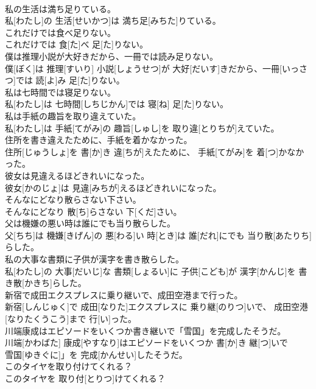 \documentclass[8pt]{extreport}
\begin{document}
\begin{CJK}{UTF8}{min}
\\	私の生活は満ち足りている。	
\\	私[わたし]の 生活[せいかつ]は 満ち足[みちた]りている。
\\	これだけでは食べ足りない。	
\\	これだけでは 食[た]べ 足[た]りない。
\\	僕は推理小説が大好きだから、一冊では読み足りない。	
\\	僕[ぼく]は 推理[すいり] 小説[しょうせつ]が 大好[だいす]きだから、一冊[いっさつ]では 読[よ]み 足[た]りない。
\\	私は七時間では寝足りない。	
\\	私[わたし]は 七時間[しちじかん]では 寝[ね] 足[た]りない。
\\	私は手紙の趣旨を取り違えていた。	
\\	私[わたし]は 手紙[てがみ]の 趣旨[しゅし]を 取り違[とりちが]えていた。
\\	住所を書き違えたために、手紙を着かなかった。	
\\	住所[じゅうしょ]を 書[か]き 違[ちが]えたために、 手紙[てがみ]を 着[つ]かなかった。
\\	彼女は見違えるほどきれいになった。	
\\	彼女[かのじょ]は 見違[みちが]えるほどきれいになった。
\\	そんなにどなり散らさない下さい。	
\\	そんなにどなり 散[ち]らさない 下[くだ]さい。
\\	父は機嫌の悪い時は誰にでも当り散らした。	
\\	父[ちち]は 機嫌[きげん]の 悪[わる]い 時[とき]は 誰[だれ]にでも 当り散[あたりち]らした。
\\	私の大事な書類に子供が漢字を書き散らした。	
\\	私[わたし]の 大事[だいじ]な 書類[しょるい]に 子供[こども]が 漢字[かんじ]を 書き散[かきち]らした。
\\	新宿で成田エクスプレスに乗り継いで、成田空港まで行った。	
\\	新宿[しんじゅく]で 成田[なりた]エクスプレスに 乗り継[のりつ]いで、 成田空港[なりたくうこう]まで 行[い]った。
\\	川端康成はエピソードをいくつか書き継いで「雪国」を完成したそうだ。	
\\	川端[かわばた] 康成[やすなり]はエピソードをいくつか 書[か]き 継[つ]いで
\\	雪国[ゆきぐに]」を 完成[かんせい]したそうだ。
\\	このタイヤを取り付けてくれる？	
\\	このタイヤを 取り付[とりつ]けてくれる？

\end{CJK}
\end{document}
